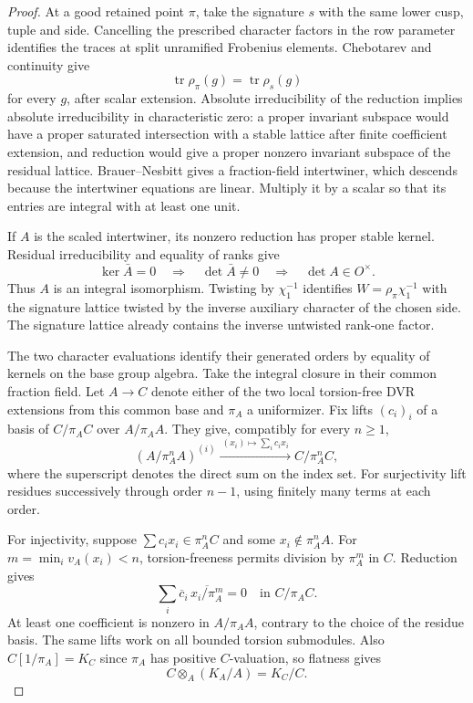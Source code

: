 \begin{proof}
At a good retained point \(\pi\), take the signature \(s\)
with the same lower cusp, tuple and side. Cancelling the
prescribed character factors in the row parameter
identifies the traces at split unramified Frobenius elements.
Chebotarev and continuity give
\[
 \operatorname{tr}\rho_\pi(g)=\operatorname{tr}\rho_s(g)
\]
for every \(g\), after scalar extension. Absolute irreducibility
of the reduction implies absolute irreducibility in characteristic
zero: a proper invariant subspace would have a proper saturated
intersection with a stable lattice after finite coefficient
extension, and reduction would give a proper nonzero invariant
subspace of the residual lattice. Brauer--Nesbitt gives
a fraction-field intertwiner, which descends because the
intertwiner equations are linear. Multiply it by a scalar so
that its entries are integral with at least one unit.

If \(A\) is the scaled intertwiner, its nonzero reduction has proper stable kernel. Residual irreducibility and equality of ranks give
\[
 \ker\bar A=0\quad\Longrightarrow\quad\det\bar A\ne0\quad\Longrightarrow\quad\det A\in O^\times.
\]
Thus \(A\) is an integral isomorphism. Twisting by
\(\chi_1^{-1}\) identifies \(W=\rho_\pi\chi_1^{-1}\)
with the signature lattice twisted by the inverse auxiliary
character of the chosen side. The signature lattice already
contains the inverse untwisted rank-one factor.

The two character evaluations identify their generated
orders by equality of kernels on the base group algebra.
Take the integral closure in their common fraction field.
Let \(A\to C\) denote either of the two local torsion-free
DVR extensions from this common base and \(\pi_A\) a
uniformizer. Fix lifts \((c_i)_i\) of a basis of \(C/\pi_A C\)
over \(A/\pi_A A\). They give, compatibly for every \(n\ge1\),
\[
 (A/\pi_A^n A)^{(i)}
     \xrightarrow{\ (x_i)\mapsto\sum_i c_i x_i\ }
                         C/\pi_A^n C ,
\]
where the superscript denotes the direct sum on the index set.
For surjectivity lift residues successively through order \(n-1\),
using finitely many terms at each order.

For injectivity, suppose \(\sum c_i x_i\in\pi_A^n C\) and some
\(x_i\notin\pi_A^n A\). For \(m=\min_i v_A(x_i)<n\), torsion-freeness
permits division by \(\pi_A^m\) in \(C\). Reduction gives
\[
 \sum_i\overline c_i\,\overline{x_i/\pi_A^m}=0\quad\text{in }C/\pi_A C.
\]
At least one coefficient is nonzero in \(A/\pi_A A\), contrary to the
choice of the residue basis. The same lifts work on all bounded torsion
submodules. Also \(C[1/\pi_A]=K_C\) since \(\pi_A\) has positive
\(C\)-valuation, so flatness gives
\[
 C\otimes_A(K_A/A)=K_C/C.
\]



\end{proof}
